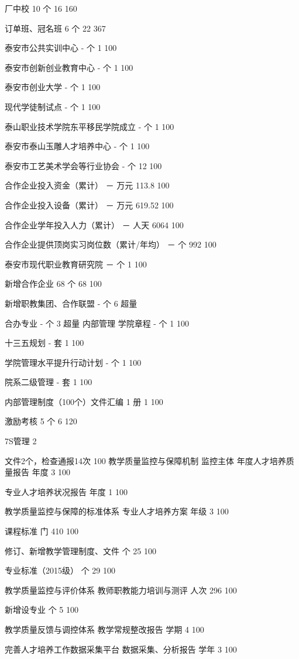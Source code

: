 厂中校
10
个
16
160%

订单班、冠名班
6
个
22
367%

泰安市公共实训中心
-
个
1
100%

泰安市创新创业教育中心
-
个
1
100%

泰安市创业大学
-
个
1
100%

现代学徒制试点
-
个
1
100%

泰山职业技术学院东平移民学院成立
-
个
1
100%

泰安市泰山玉雕人才培养中心
-
个
1
100%

泰安市工艺美术学会等行业协会
-
个
12
100%

合作企业投入资金（累计）
－
万元
113.8
100%

合作企业投入设备（累计）
－
万元
619.52
100%

合作企业学年投入人力（累计）
－
人天
6064
100%

合作企业提供顶岗实习岗位数（累计/年均）
－
个
992
100%

泰安市现代职业教育研究院
－
个
1
100%

新增合作企业
68
个
68
100%

新增职教集团、合作联盟
-
个
6
超量

合办专业
-
个
3
超量
内部管理
学院章程
-
个
1
100%

十三五规划
-
套
1
100%

学院管理水平提升行动计划
-
个
1
100%

院系二级管理
-
套
1
100%

内部管理制度（100个）文件汇编
1
册
1
100%

激励考核
5
个
6
120%

7S管理
2

文件2个，检查通报14次
100%
教学质量监控与保障机制
监控主体
年度人才培养质量报告
年度
3
100%


专业人才培养状况报告
年度
1
100%

教学质量监控与保障的标准体系
专业人才培养方案
年级
3
100%


课程标准
门
410
100%


修订、新增教学管理制度、文件
个
25
100%


专业标准（2015级）
个
29
100%

教学质量监控与评价体系
教师职教能力培训与测评
人次
296
100%


新增设专业
个
5
100%

教学质量反馈与调控体系
教学常规整改报告
学期
4
100%

完善人才培养工作数据采集平台
数据采集、分析报告
学年
3
100%

